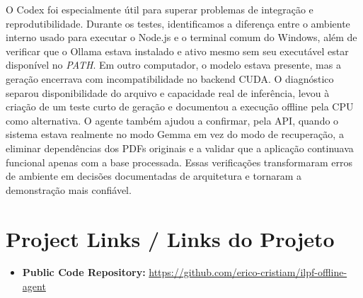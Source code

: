 \documentclass[12pt,a4paper]{article}
\begin{document}
O Codex foi especialmente útil para superar problemas de integração e reprodutibilidade. Durante os testes, identificamos a diferença entre o ambiente interno usado para executar o Node.js e o terminal comum do Windows, além de verificar que o Ollama estava instalado e ativo mesmo sem seu executável estar disponível no \textit{PATH}. Em outro computador, o modelo estava presente, mas a geração encerrava com incompatibilidade no backend CUDA. O diagnóstico separou disponibilidade do arquivo e capacidade real de inferência, levou à criação de um teste curto de geração e documentou a execução offline pela CPU como alternativa. O agente também ajudou a confirmar, pela API, quando o sistema estava realmente no modo Gemma em vez do modo de recuperação, a eliminar dependências dos PDFs originais e a validar que a aplicação continuava funcional apenas com a base processada. Essas verificações transformaram erros de ambiente em decisões documentadas de arquitetura e tornaram a demonstração mais confiável.

\section{Project Links / Links do Projeto}
\begin{itemize}
    \item \textbf{Public Code Repository:} \url{https://github.com/erico-cristiam/ilpf-offline-agent}
\end{itemize}
\end{document}
